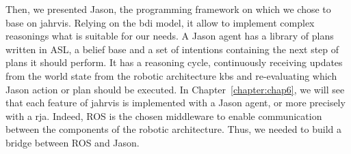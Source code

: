 \documentclass[a4paper,11pt,twoside]{StyleThese}
\begin{document}
Then, we presented Jason, the programming framework on which we chose to base on \acrshort{jahrvis}. Relying on the \acrshort{bdi} model, it allow to implement complex reasonings what is suitable for our needs. A Jason agent has a library of plans written in ASL, a belief base and a set of intentions containing the next step of plans it should perform. It has a reasoning cycle, continuously receiving updates from the world state from the robotic architecture \acrshort{kb}s and re-evaluating which Jason action or plan should be executed. In Chapter~\ref{chapter:chap6}, we will see that each feature of \acrshort{jahrvis} is implemented with a Jason agent, or more precisely with a \acrfull{rja}. Indeed, ROS is the chosen middleware to enable communication between the components of the robotic architecture. Thus, we needed to build a bridge between ROS and Jason. 


\ifdefined{}
\else


\end{document}
